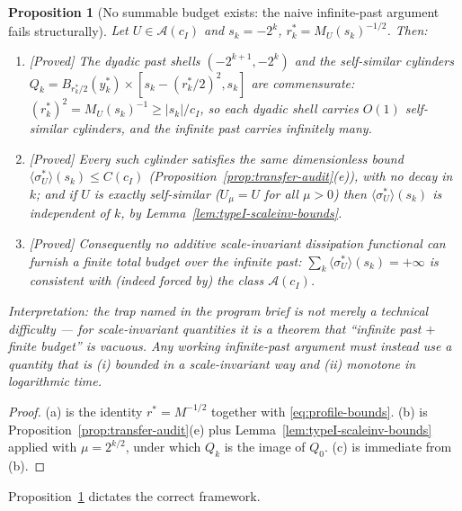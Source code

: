 \documentclass[11pt]{article}
\newtheorem{proposition}[theorem]{Proposition}
\theoremstyle{definition}
\theoremstyle{remark}
\begin{document}
\begin{proposition}[No summable budget exists: the naive infinite-past
  argument fails structurally]\label{prop:no-summable-budget}
  Let $U\in\mathcal{A}(c_I)$ and $s_k=-2^k$, $r^*_k=M_U(s_k)^{-1/2}$. Then:
  \begin{enumerate}[label=(\alph*)]
  \item \emph{[Proved]} The dyadic past shells $(-2^{k+1},-2^k)$ and the
    self-similar cylinders $Q_k=B_{r^*_k/2}(y^*_k)\times[s_k-(r^*_k/2)^2,s_k]$
    are commensurate: $(r^*_k)^2 = M_U(s_k)^{-1}\geq |s_k|/c_I$, so each
    dyadic shell carries $O(1)$ self-similar cylinders, and the infinite past
    carries infinitely many.
  \item \emph{[Proved]} Every such cylinder satisfies the \emph{same}
    dimensionless bound $\langle\sigma^*_U\rangle(s_k)\leq C(c_I)$
    (Proposition~\ref{prop:transfer-audit}(e)), with no decay in $k$; and if
    $U$ is exactly self-similar ($U_\mu=U$ for all $\mu>0$) then
    $\langle\sigma^*_U\rangle(s_k)$ is \emph{independent} of $k$, by
    Lemma~\ref{lem:typeI-scaleinv-bounds}.
  \item \emph{[Proved]} Consequently no additive scale-invariant dissipation
    functional can furnish a finite total budget over the infinite past:
    $\sum_k\langle\sigma^*_U\rangle(s_k)=+\infty$ is consistent with (indeed
    forced by) the class $\mathcal{A}(c_I)$.
  \end{enumerate}
  \emph{Interpretation: the trap named in the program brief is not merely a
  technical difficulty --- for scale-invariant quantities it is a theorem
  that ``infinite past $+$ finite budget'' is vacuous. Any working
  infinite-past argument must instead use a quantity that is (i) bounded in a
  scale-invariant way and (ii) \emph{monotone} in logarithmic time.}
\end{proposition}
\begin{proof}
  (a) is the identity $r^*=M^{-1/2}$ together with
  \eqref{eq:profile-bounds}. (b) is
  Proposition~\ref{prop:transfer-audit}(e) plus
  Lemma~\ref{lem:typeI-scaleinv-bounds} applied with $\mu=2^{k/2}$, under
  which $Q_k$ is the image of $Q_0$. (c) is immediate from (b).
\end{proof}

Proposition~\ref{prop:no-summable-budget} dictates the correct framework.
\end{document}
